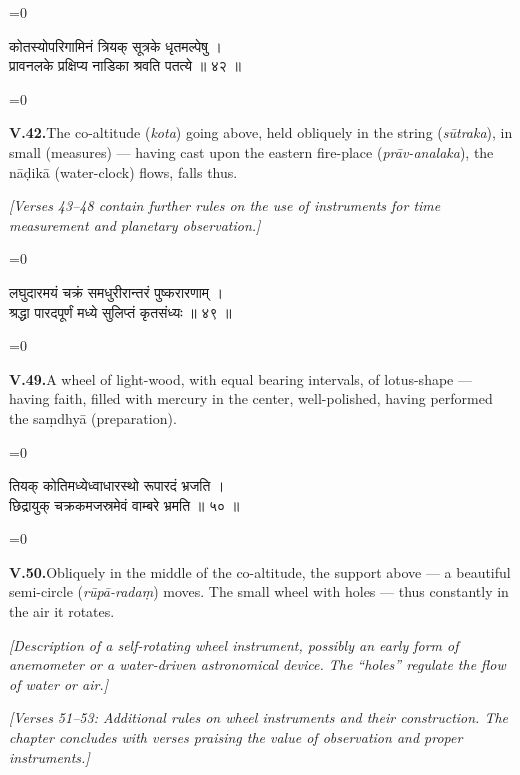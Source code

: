 \documentclass[11pt,a4paper]{article}
\newcommand{\cnote}[1]{\textcolor{notecolor}{\textit{#1}}}
\newcommand{\dev}[1]{{\devanagarifont\color{sktcolor}#1}}
\newcommand{\iast}[1]{\textit{#1}}
\newenvironment{paracol}[1]{\begingroup}{\endgroup}
\newcommand{\switchcolumn}[1][]{%
  \ifnum#1=0\relax\else\par\nobreak\vspace{0.5em}\par\nobreak\fi%
}
\begin{document}
\vspace{0.3cm}

\begin{paracol}{2}
\switchcolumn[0]
\dev{%
कोतस्योपरिगामिनं त्रियक् सूत्रके धृतमल्पेषु ।\\
प्रावनलके प्रक्षिप्य नाडिका श्रवति पतत्ये ॥ ४२ ॥
}

\switchcolumn[1]
\textbf{V.42.}\quad The co-altitude (\iast{kota}) going above,
held obliquely in the string (\iast{sūtraka}), in small
(measures) — having cast upon the eastern fire-place (\iast{prāv-analaka}),
the nāḍikā (water-clock) flows, falls thus.
\end{paracol}

\vspace{0.5cm}
\cnote{[Verses 43–48 contain further rules on the use of instruments
for time measurement and planetary observation.]}
\vspace{0.5cm}

\begin{paracol}{2}
\switchcolumn[0]
\dev{%
लघुदारमयं चक्रं समधुरीरान्तरं पुष्करारणाम् ।\\
श्रद्धा पारदपूर्णं मध्ये सुलिप्तं कृतसंध्यः ॥ ४९ ॥
}

\switchcolumn[1]
\textbf{V.49.}\quad A wheel of light-wood, with equal bearing
intervals, of lotus-shape — having faith, filled with mercury
in the center, well-polished, having performed the saṃdhyā
(preparation).
\end{paracol}

\vspace{0.3cm}

\begin{paracol}{2}
\switchcolumn[0]
\dev{%
तियक् कोतिमध्येध्वाधारस्थो रूपारदं भ्रजति ।\\
छिद्रायुक् चक्रकमजस्रमेवं वाम्बरे भ्रमति ॥ ५० ॥
}

\switchcolumn[1]
\textbf{V.50.}\quad Obliquely in the middle of the co-altitude,
the support above — a beautiful semi-circle (\iast{rūpā-radaṃ})
moves. The small wheel with holes — thus constantly in the
air it rotates.

\medskip
\textit{[Description of a self-rotating wheel instrument, possibly
an early form of anemometer or a water-driven astronomical
device. The ``holes'' regulate the flow of water or air.]}
\end{paracol}

\vspace{0.5cm}
\cnote{[Verses 51–53: Additional rules on wheel instruments and their
construction. The chapter concludes with verses praising the value
of observation and proper instruments.]}
\vspace{0.5cm}
\end{document}

